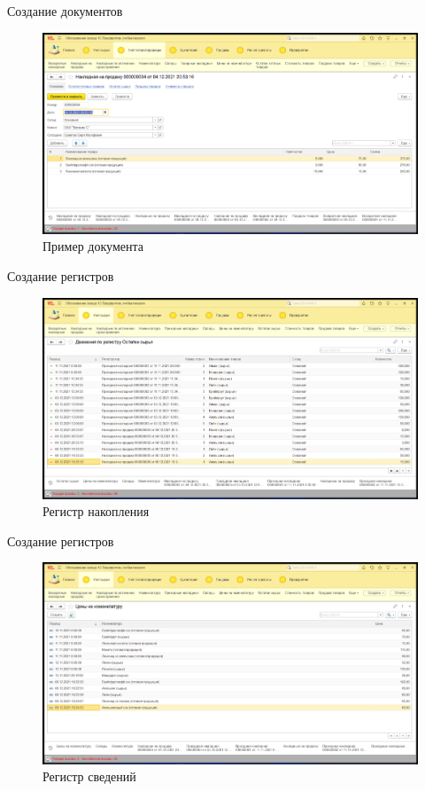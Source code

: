 \documentclass[12pt,a4paper,mathserif]{beamer}
\begin{document}
\begin{frame}{Создание документов}
    \begin{figure}
        \centering
        \includegraphics[scale=0.25]{document.png}
        \caption{Пример документа}
        \label{fig:document}
    \end{figure}
\end{frame}

\begin{frame}{Создание регистров}
    \begin{figure}
        \centering
        \includegraphics[scale=0.25]{accumulation.png}
        \caption{Регистр накопления}
        \label{fig:accumulation}
    \end{figure}
\end{frame}

\begin{frame}{Создание регистров}
    \begin{figure}
        \centering
        \includegraphics[scale=0.25]{information.png}
        \caption{Регистр сведений}
        \label{fig:information}
    \end{figure}
\end{frame}
\end{document}

